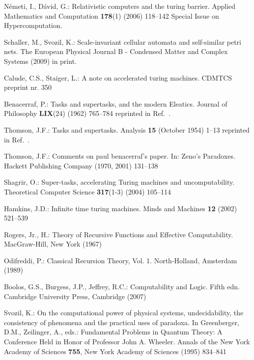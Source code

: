 \documentclass{llncs}
\begin{document}
\begin{thebibliography}{10}
N{\'{e}}meti, I., D{\'{a}}vid, G.:
\newblock Relativistic computers and the turing barrier.
\newblock Applied Mathematics and Computation \textbf{178}(1) (2006)  118--142
  Special Issue on Hypercomputation.

Schaller, M., Svozil, K.:
\newblock Scale-invariant cellular automata and self-similar petri nets.
\newblock The European Physical Journal B - Condensed Matter and Complex
  Systems (2009) in print.

Calude, C.S., Staiger, L.:
\newblock A note on accelerated turing machines.
\newblock CDMTCS preprint nr. 350

Benacerraf, P.:
\newblock Tasks and supertasks, and the modern {E}leatics.
\newblock Journal of Philosophy \textbf{LIX}(24) (1962)  765--784 reprinted in
  Ref.~\cite[pp.~103-129]{salmon-01}.

Thomson, J.F.:
\newblock Tasks and supertasks.
\newblock Analysis \textbf{15} (October 1954)  1--13 reprinted in
  Ref.~\cite[pp.~89-102]{salmon-01}.

Thomson, J.F.:
\newblock Comments on paul benacerraf's paper.
\newblock In: Zeno's Paradoxes.
\newblock Hackett Publishing Company (1970, 2001)  131--138

Shagrir, O.:
\newblock Super-tasks, accelerating {T}uring machines and uncomputability.
\newblock Theoretical Computer Science \textbf{317}(1-3) (2004)  105--114

Hamkins, J.D.:
\newblock Infinite time turing machines.
\newblock Minds and Machines \textbf{12} (2002)  521--539

{Rogers, Jr.}, H.:
\newblock Theory of Recursive Functions and Effective Computability.
\newblock MacGraw-Hill, New York (1967)

Odifreddi, P.:
\newblock Classical Recursion Theory, Vol. 1.
\newblock North-Holland, Amsterdam (1989)

Boolos, G.S., Burgess, J.P., Jeffrey, R.C.:
\newblock Computability and Logic. Fifth edn.
\newblock Cambridge University Press, Cambridge (2007)

Svozil, K.:
\newblock On the computational power of physical systems, undecidability, the
  consistency of phenomena and the practical uses of paradoxa.
\newblock In Greenberger, D.M., Zeilinger, A., eds.: Fundamental Problems in
  Quantum Theory: A Conference Held in Honor of Professor John A. Wheeler.
  Annals of the New York Academy of Sciences {\bf 755}, New York Academy of
  Sciences (1995)  834--841


\end{thebibliography}
\end{document}
